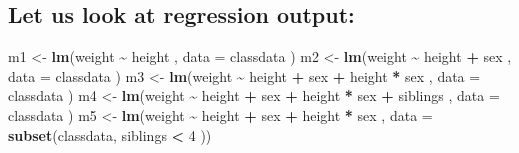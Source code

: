 \documentclass[
  doc]{apa6}
\newenvironment{Shaded}{\begin{snugshade}}{\end{snugshade}}
\newcommand{\AttributeTok}[1]{\textcolor[rgb]{0.13,0.29,0.53}{#1}}
\newcommand{\DecValTok}[1]{\textcolor[rgb]{0.00,0.00,0.81}{#1}}
\newcommand{\FunctionTok}[1]{\textcolor[rgb]{0.13,0.29,0.53}{\textbf{#1}}}
\newcommand{\NormalTok}[1]{#1}
\newcommand{\OtherTok}[1]{\textcolor[rgb]{0.56,0.35,0.01}{#1}}
\newcommand{\SpecialCharTok}[1]{\textcolor[rgb]{0.81,0.36,0.00}{\textbf{#1}}}
\begin{document}
\newpage

\hypertarget{let-us-look-at-regression-output}{%
\subsection{Let us look at regression output:}\label{let-us-look-at-regression-output}}

\begin{Shaded}
\begin{Highlighting}[]
\NormalTok{m1 }\OtherTok{\textless{}{-}} \FunctionTok{lm}\NormalTok{(weight }\SpecialCharTok{\textasciitilde{}}\NormalTok{ height , }\AttributeTok{data =}\NormalTok{ classdata )}
\NormalTok{m2 }\OtherTok{\textless{}{-}} \FunctionTok{lm}\NormalTok{(weight }\SpecialCharTok{\textasciitilde{}}\NormalTok{ height }\SpecialCharTok{+}\NormalTok{ sex , }\AttributeTok{data =}\NormalTok{ classdata )}
\NormalTok{m3 }\OtherTok{\textless{}{-}} \FunctionTok{lm}\NormalTok{(weight }\SpecialCharTok{\textasciitilde{}}\NormalTok{ height }\SpecialCharTok{+}\NormalTok{ sex }\SpecialCharTok{+}\NormalTok{ height }\SpecialCharTok{*}\NormalTok{ sex , }\AttributeTok{data =}\NormalTok{ classdata )}
\NormalTok{m4 }\OtherTok{\textless{}{-}} \FunctionTok{lm}\NormalTok{(weight }\SpecialCharTok{\textasciitilde{}}\NormalTok{ height }\SpecialCharTok{+}\NormalTok{ sex }\SpecialCharTok{+}\NormalTok{ height }\SpecialCharTok{*}\NormalTok{ sex }\SpecialCharTok{+}\NormalTok{ siblings , }\AttributeTok{data =}\NormalTok{ classdata )}
\NormalTok{m5 }\OtherTok{\textless{}{-}} \FunctionTok{lm}\NormalTok{(weight }\SpecialCharTok{\textasciitilde{}}\NormalTok{ height }\SpecialCharTok{+}\NormalTok{ sex }\SpecialCharTok{+}\NormalTok{ height }\SpecialCharTok{*}\NormalTok{ sex , }\AttributeTok{data =} \FunctionTok{subset}\NormalTok{(classdata, siblings }\SpecialCharTok{\textless{}} \DecValTok{4}\NormalTok{ ))}
\end{Highlighting}
\end{Shaded}

\newpage
\end{document}
